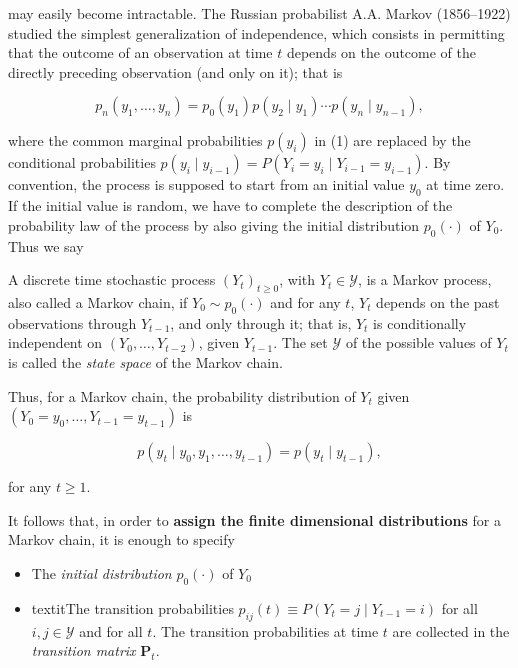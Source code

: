 \documentclass[dvipsnames,12pt]{book}
\begin{document}
            may easily become intractable. The Russian probabilist A.A. Markov (1856–1922) studied the simplest generalization of independence, which consists in permitting that the outcome of an observation at time \( t \) depends on the outcome of the directly preceding observation (and only on it); that is

            \begin{equation}
                p_n(y_1, \dots, y_n) = p_{0}(y_1) p(y_2 \mid y_1) \cdots p(y_n \mid y_{n-1}),
            \end{equation}

            where the common marginal probabilities \( p(y_i) \) in (1) are replaced by the conditional probabilities \( p(y_i \mid y_{i-1}) = P(Y_i = y_i \mid Y_{i-1} = y_{i-1}) \). By convention, the process is supposed to start from an initial value \( y_0 \) at time zero. If the initial value is random, we have to complete the description of the probability law of the process by also giving the initial distribution \( p_0(\cdot) \) of \( Y_0 \). Thus we say

            \begin{definition}
                A discrete time stochastic process \( (Y_t)_{t \geq 0} \), with \( Y_t \in \mathcal{Y} \), is a Markov process, also called a Markov chain, if \( Y_0 \sim p_0(\cdot) \) and for any \( t \), \( Y_t \) depends on the past observations through \( Y_{t-1} \), and only through it; that is, \( Y_t \) is conditionally independent on \( (Y_0, \dots, Y_{t-2}) \), given \( Y_{t-1} \). The set \( \mathcal{Y} \) of the possible values of \( Y_t \) is called the \textit{state space} of the Markov chain.
            \end{definition}

            Thus, for a Markov chain, the probability distribution of \( Y_t \) given \( (Y_0 = y_0, \dots, Y_{t-1} = y_{t-1}) \) is

            \begin{equation}
                p(y_t \mid y_0, y_1, \dots, y_{t-1}) = p(y_t \mid y_{t-1}),
            \end{equation}
            
            for any \( t \geq 1 \).
            
            It follows that, in order to \textbf{assign the finite dimensional distributions} for a Markov chain, it is enough to specify

            \begin{itemize}
                \item The \textit{initial distribution} \( p_0(\cdot) \) of \( Y_0 \)
                \item textit{The transition probabilities} \( p_{ij}(t) \equiv P(Y_t = j \mid Y_{t-1} = i) \) for all \( i, j \in \mathcal{Y} \) and for all \( t \). The transition probabilities at time \( t \) are collected in the \textit{transition matrix} \( \mathbf{P}_t \).

            \end{itemize}
\end{document}
